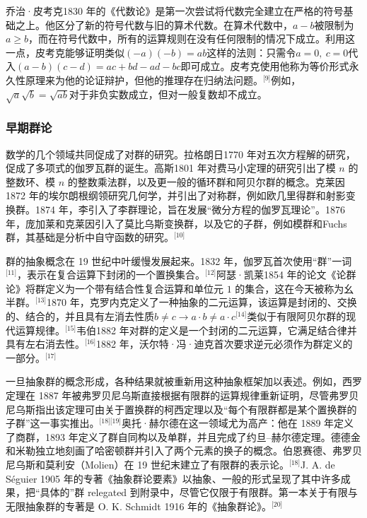 乔治·皮考克1830 年的《代数论》是第一次尝试将代数完全建立在严格的符号基础之上。他区分了新的符号代数与旧的算术代数。在算术代数中，$a - b$被限制为$a \geq b$，而在符号代数中，所有的运算规则在没有任何限制的情况下成立。利用这一点，皮考克能够证明类似$(-a)(-b) = ab$这样的法则：只需令$a = 0,\ c = 0$代入$(a - b)(c - d) = ac + bd - ad - bc$即可成立。皮考克使用他称为等价形式永久性原理来为他的论证辩护，但他的推理存在归纳法问题。\(^\text{[9]}\)例如，$\sqrt{a}\sqrt{b} = \sqrt{ab}$对于非负实数成立，但对一般复数却不成立。
\subsubsection{早期群论}
数学的几个领域共同促成了对群的研究。拉格朗日1770 年对五次方程解的研究，促成了多项式的伽罗瓦群的诞生。高斯1801 年对费马小定理的研究引出了模 $n$ 的整数环、模 $n$ 的整数乘法群，以及更一般的循环群和阿贝尔群的概念。克莱因1872 年的埃尔朗根纲领研究几何学，并引出了对称群，例如欧几里得群和射影变换群。1874 年，李引入了李群理论，旨在发展“微分方程的伽罗瓦理论”。1876 年，庞加莱和克莱因引入了莫比乌斯变换群，以及它的子群，例如模群和Fuchs 群，其基础是分析中自守函数的研究。\(^\text{[10]}\)

群的抽象概念在 19 世纪中叶缓慢发展起来。1832 年，伽罗瓦首次使用“群”一词\(^\text{[11]}\)，表示在复合运算下封闭的一个置换集合。\(^\text{[12]}\)阿瑟·凯莱1854 年的论文《论群论》将群定义为一个带有结合性复合运算和单位元 $1$ 的集合，这在今天被称为幺半群。\(^\text{[13]}\)1870 年，克罗内克定义了一种抽象的二元运算，该运算是封闭的、交换的、结合的，并且具有左消去性质$b \neq c \to a \cdot b \neq a \cdot c$\(^\text{[14]}\)类似于有限阿贝尔群的现代运算规律。\(^\text{[15]}\)韦伯1882 年对群的定义是一个封闭的二元运算，它满足结合律并具有左右消去性。\(^\text{[16]}\)1882 年，沃尔特·冯·迪克首次要求逆元必须作为群定义的一部分。\(^\text{[17]}\)

一旦抽象群的概念形成，各种结果就被重新用这种抽象框架加以表述。例如，西罗定理在 1887 年被弗罗贝尼乌斯直接根据有限群的运算规律重新证明，尽管弗罗贝尼乌斯指出该定理可由关于置换群的柯西定理以及“每个有限群都是某个置换群的子群”这一事实推出。\(^\text{[18][19]}\)奥托·赫尔德在这一领域尤为高产：他在 1889 年定义了商群，1893 年定义了群自同构以及单群，并且完成了约旦–赫尔德定理。德德金和米勒独立地刻画了哈密顿群并引入了两个元素的换子的概念。伯恩赛德、弗罗贝尼乌斯和莫利安（Molien）在 19 世纪末建立了有限群的表示论。\(^\text{[18]}\)J. A. de Séguier 1905 年的专著《抽象群论要素》以抽象、一般的形式呈现了其中许多成果，把“具体的”群 relegated 到附录中，尽管它仅限于有限群。第一本关于有限与无限抽象群的专著是 O. K. Schmidt 1916 年的《抽象群论》。\(^\text{[20]}\)
